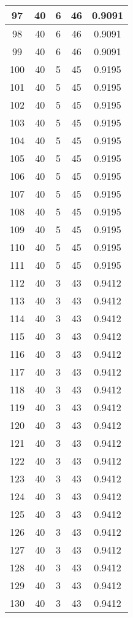 \documentclass[letterpaper, 12pt]{article}
\begin{document}
\begin{longtable}{|c|c|c|c|c|}
\hline
97 & 40 & 6 & 46 & 0.9091 \\
\hline
98 & 40 & 6 & 46 & 0.9091 \\
\hline
99 & 40 & 6 & 46 & 0.9091 \\
\hline
100 & 40 & 5 & 45 & 0.9195 \\
\hline
101 & 40 & 5 & 45 & 0.9195 \\
\hline
102 & 40 & 5 & 45 & 0.9195 \\
\hline
103 & 40 & 5 & 45 & 0.9195 \\
\hline
104 & 40 & 5 & 45 & 0.9195 \\
\hline
105 & 40 & 5 & 45 & 0.9195 \\
\hline
106 & 40 & 5 & 45 & 0.9195 \\
\hline
107 & 40 & 5 & 45 & 0.9195 \\
\hline
108 & 40 & 5 & 45 & 0.9195 \\
\hline
109 & 40 & 5 & 45 & 0.9195 \\
\hline
110 & 40 & 5 & 45 & 0.9195 \\
\hline
111 & 40 & 5 & 45 & 0.9195 \\
\hline
112 & 40 & 3 & 43 & 0.9412 \\
\hline
113 & 40 & 3 & 43 & 0.9412 \\
\hline
114 & 40 & 3 & 43 & 0.9412 \\
\hline
115 & 40 & 3 & 43 & 0.9412 \\
\hline
116 & 40 & 3 & 43 & 0.9412 \\
\hline
117 & 40 & 3 & 43 & 0.9412 \\
\hline
118 & 40 & 3 & 43 & 0.9412 \\
\hline
119 & 40 & 3 & 43 & 0.9412 \\
\hline
120 & 40 & 3 & 43 & 0.9412 \\
\hline
121 & 40 & 3 & 43 & 0.9412 \\
\hline
122 & 40 & 3 & 43 & 0.9412 \\
\hline
123 & 40 & 3 & 43 & 0.9412 \\
\hline
124 & 40 & 3 & 43 & 0.9412 \\
\hline
125 & 40 & 3 & 43 & 0.9412 \\
\hline
126 & 40 & 3 & 43 & 0.9412 \\
\hline
127 & 40 & 3 & 43 & 0.9412 \\
\hline
128 & 40 & 3 & 43 & 0.9412 \\
\hline
129 & 40 & 3 & 43 & 0.9412 \\
\hline
130 & 40 & 3 & 43 & 0.9412 \\

\end{longtable}
\end{document}
